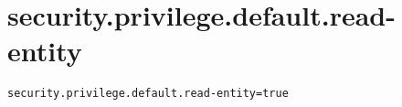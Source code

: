 \section{security.privilege.default.read-entity}
\label{configuration:SecurityPrivilegeDefaultReadEntity}
\AvailableInJavaOnly{\TODO}
\begin{lstlisting}[style=Props,caption={Usage example for \textit{security.privilege.default.read-entity}}]
security.privilege.default.read-entity=true
\end{lstlisting}